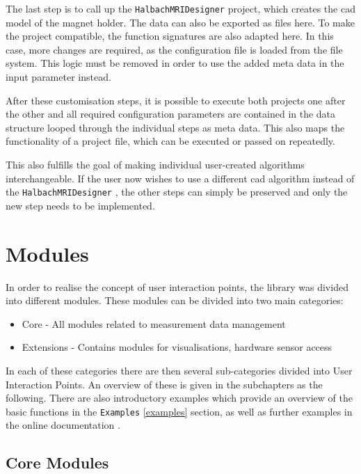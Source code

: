 The last step is to call up the
\passthrough{\lstinline!HalbachMRIDesigner!}
\cite{HalbachMRIDesigner} project, which creates the \gls{cad} model
of the magnet holder. The data can also be exported as files here. To
make the project compatible, the function signatures are also adapted
here. In this case, more changes are required, as the configuration file
is loaded from the file system. This logic must be removed in order to
use the added meta data in the input parameter instead.

After these customisation steps, it is possible to execute both projects
one after the other and all required configuration parameters are
contained in the data structure looped through the individual steps as
meta data. This also maps the functionality of a project file, which can
be executed or passed on repeatedly.

This also fulfills the goal of making individual user-created algorithms
interchangeable. If the user now wishes to use a different \gls{cad}
algorithm instead of the \passthrough{\lstinline!HalbachMRIDesigner!}
\cite{HalbachMRIDesigner}, the other steps can simply be preserved
and only the new step needs to be implemented.

\hypertarget{modules}{%
\section{Modules}\label{modules}}

In order to realise the concept of user interaction points, the library
was divided into different modules. These modules can be divided into
two main categories:

\begin{itemize}
\tightlist
\item
  Core - All modules related to measurement data management
\item
  Extensions - Contains modules for visualisations, hardware sensor
  access
\end{itemize}

In each of these categories there are then several sub-categories
divided into User Interaction Points. An overview of these is given in
the subchapters as the following. There are also introductory examples
which provide an overview of the basic functions in the
\passthrough{\lstinline!Examples!} \ref{examples} section, as well as
further examples in the online documentation
\cite{MagneticReadoutProcessingReadTheDocs}.

\hypertarget{core-modules}{%
\subsection{Core Modules}\label{core-modules}}

